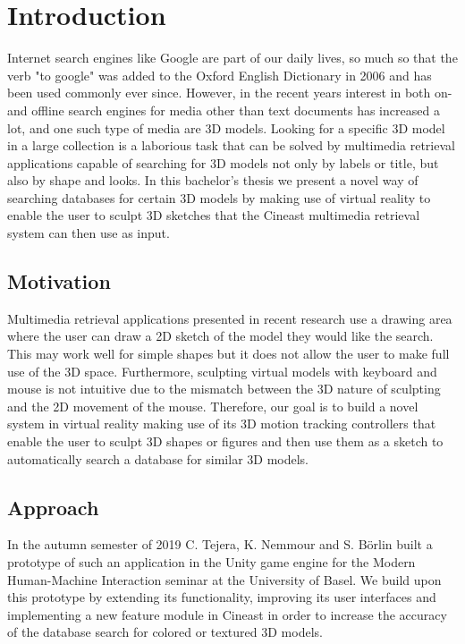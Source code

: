 \chapter{Introduction}

Internet search engines like Google are part of our daily lives, so much so that the verb "to google" was added to the Oxford English Dictionary in 2006 and has been used commonly ever since. However, in the recent years interest in 
both on- and offline search engines for media other than text documents has increased a lot, and one such type of media are 3D models. Looking for a specific 3D model in a large collection is a laborious task that can be solved by multimedia retrieval applications capable of searching for 3D models not only by labels or title, but also by shape and looks. In this bachelor's thesis we present a novel way of searching databases for certain 3D models by making use of virtual reality to enable the user to sculpt 3D sketches that the Cineast multimedia retrieval system can then use as input.

\section{Motivation}

Multimedia retrieval applications presented in recent research use a drawing area where the user can draw a 2D sketch of the model they would like the search. This may work well for simple shapes but it does not allow the user to make full use of the 3D space. Furthermore, sculpting virtual models with keyboard and mouse is not intuitive due to the mismatch between the 3D nature of sculpting and the 2D movement of the mouse. Therefore, our goal is to build a novel system in virtual reality making use of its 3D motion tracking controllers that enable the user to sculpt 3D shapes or figures and then use them as a sketch to automatically search a database for similar 3D models.

\section{Approach}

In the autumn semester of 2019 C. Tejera, K. Nemmour and S. Börlin built a prototype of such an application in the Unity game engine for the Modern Human-Machine Interaction seminar at the University of Basel.
We build upon this prototype by extending its functionality, improving its user interfaces and implementing a new feature module in Cineast in order to increase the accuracy of the database search for colored or textured 3D models.